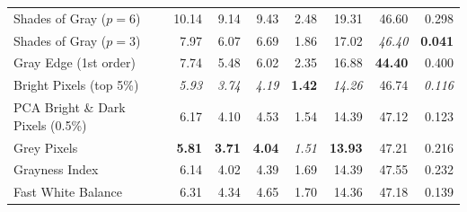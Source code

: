 \begin{longtable}{@{}>{\raggedright\arraybackslash}p{6.8cm}rrrrrrr@{}}
Shades of Gray ($p=6$)~\cite{shades_of_gray} & 10.14 & 9.14 & 9.43 & 2.48 & 19.31 & 46.60 & 0.298 \\
Shades of Gray ($p=3$)~\cite{shades_of_gray} & 7.97 & 6.07 & 6.69 & 1.86 & 17.02 & \textit{46.40} & \textbf{0.041} \\
Gray Edge (1st order)~\cite{gray_edge} & 7.74 & 5.48 & 6.02 & 2.35 & 16.88 & \textbf{44.40} & 0.400 \\
Bright Pixels (top 5\%)~\cite{bright_pixels} & \textit{5.93} & \textit{3.74} & \textit{4.19} & \textbf{1.42} & \textit{14.26} & 46.74 & \textit{0.116} \\
PCA Bright \& Dark Pixels (0.5\%)~\cite{cheng2014illuminant} & 6.17 & 4.10 & 4.53 & 1.54 & 14.39 & 47.12 & 0.123 \\
Grey Pixels~\cite{yangGrayPixels} & \textbf{5.81} & \textbf{3.71} & \textbf{4.04} & \textit{1.51} & \textbf{13.93} & 47.21 & 0.216 \\
Grayness Index~\cite{qianFindingGrayPixels} & 6.14 & 4.02 & 4.39 & 1.69 & 14.39 & 47.55 & 0.232 \\
Fast White Balance~\cite{fast_wb_greyness} & 6.31 & 4.34 & 4.65 & 1.70 & 14.36 & 47.18 & 0.139 \\
\end{longtable}
\endgroup

